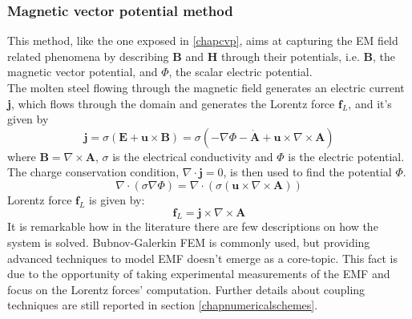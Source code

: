 \subsubsection{Magnetic vector potential method}
\label{chapmagneticpotentialmethod}
This method, like the one exposed in \ref{chapcvp}, aims at capturing the EM field related phenomena by describing \textbf{B} and \textbf{H} through their potentials, i.e. \textbf{B}, the magnetic vector potential, and $\Phi$, the scalar electric potential.\\
The molten steel flowing through the magnetic field generates an electric current \textbf{j}, which flows through the domain and generates the Lorentz force $\textbf{f}_L$, and it's given by
\begin{equation}
\textbf{j}=\sigma(\textbf{E}+\textbf{u}\times \textbf{B})=\sigma(-\nabla \Phi-\dot{\textbf{A}}+\textbf{u}\times \nabla \times \textbf{A})
\end{equation}
where $\textbf{B}=\nabla \times \textbf{A}$, $\sigma$ is the electrical conductivity and $\Phi$ is the electric potential.\\
The charge conservation condition, $\nabla \cdot \textbf{j}=0$, is then used to find the potential $\Phi$.
\begin{equation}
\nabla \cdot (\sigma \nabla \Phi )=\nabla \cdot (\sigma ( \textbf{u}\times \nabla \times \textbf{A}))
\end{equation}
Lorentz force $\textbf{f}_L$ is given by:
\begin{equation}
\textbf{f}_L=\textbf{j}\times \nabla \times \textbf{A}
\end{equation}
It is remarkable how in the literature there are few descriptions on how the system is solved. Bubnov-Galerkin FEM is commonly used, but providing advanced techniques to model EMF doesn't emerge as a core-topic. This fact is due to the opportunity of taking experimental measurements of the EMF and focus on the Lorentz forces' computation. Further details about coupling techniques are still reported in section \ref{chapnumericalschemes}.

